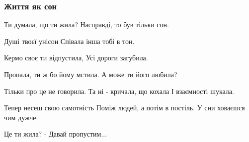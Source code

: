  
 
 

\subsubsection{Життя як сон}
\label{sec:poetry.rus.olesja_gavryshko.zhyttja_jak_son}

Ти думала, що ти жила?
Насправді, то був тільки сон.

Душі твоєї унісон
Співала інша тобі в тон.

Кермо своє ти відпустила,
Усі дороги загубила.

Пропала, ти ж бо йому мстила.
А може ти його любила?

Тільки про це не говорила.
Та ні - кричала, що кохала
І взаємності шукала.

Тепер несеш свою самотність
Поміж людей, а потім в постіль.
У сни ховаєшся чим дужче.

Це ти жила? - Давай пропустим...
